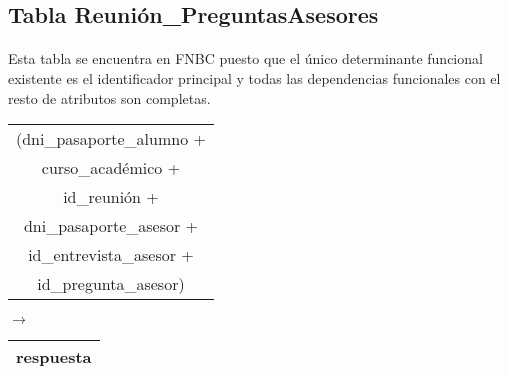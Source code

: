 \subsection{Tabla Reunión\_PreguntasAsesores}

  \paragraph{}Esta tabla se encuentra en FNBC puesto que el único determinante
  funcional existente es el identificador principal y todas las dependencias
  funcionales con el resto de atributos son completas.

  \begin{center}
    \begin{minipage}{5.0cm}{\begin{flushright}\begin{tabular}{ | c | }
                  \hline
                  (dni\_pasaporte\_alumno + \\
                  curso\_académico + \\
                  id\_reunión + \\
                  dni\_pasaporte\_asesor + \\
                  id\_entrevista\_asesor + \\
                  id\_pregunta\_asesor) \\
                  \hline
                 \end{tabular}\end{flushright} }
    \end{minipage}
    \begin{minipage}{0.7cm}{$\longrightarrow$}
    \end{minipage}
    \begin{minipage}{5.9cm}{\begin{tabular}{ | c | }
                  \hline
                  respuesta \\
                  \hline
                 \end{tabular} }
    \end{minipage}
  \end{center}
